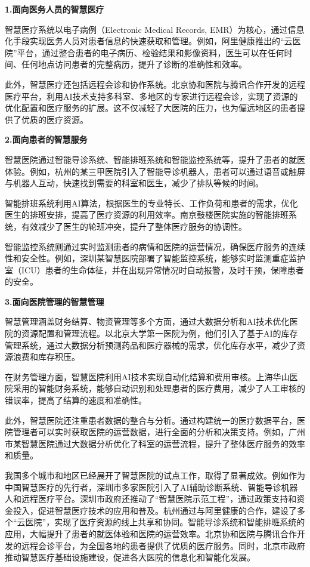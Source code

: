 \textbf{1.面向医务人员的智慧医疗}

智慧医疗系统以电子病例（Electronic Medical Records, EMR）为核心，通过信息化手段实现医务人员对患者信息的快速获取和管理。例如，阿里健康推出的“云医院”平台，通过整合患者的电子病历、检验结果和影像资料，医生可以在任何时间、任何地点访问患者的完整病历，提升了诊断的准确性和效率。

此外，智慧医疗还包括远程会诊和协作系统。北京协和医院与腾讯合作开发的远程医疗平台，利用AI技术支持多科室、多地区的专家进行远程会诊，实现了资源的优化配置和医疗服务的扩展。这不仅减轻了大医院的压力，也为偏远地区的患者提供了优质的医疗资源。

\textbf{2.面向患者的智慧服务}

智慧医院通过智能导诊系统、智能排班系统和智能监控系统等，提升了患者的就医体验。例如，杭州的某三甲医院引入了智能导诊机器人，患者可以通过语音或触屏与机器人互动，快速找到需要的科室和医生，减少了排队等候的时间。

智能排班系统利用AI算法，根据医生的专业特长、工作负荷和患者的需求，优化医生的排班安排，提高了医疗资源的利用效率。南京鼓楼医院实施的智能排班系统，有效减少了医生的轮班冲突，提升了整体医疗服务的协调性。

智能监控系统则通过实时监测患者的病情和医院的运营情况，确保医疗服务的连续性和安全性。例如，深圳某智慧医院部署了智能监控系统，能够实时监测重症监护室（ICU）患者的生命体征，并在出现异常情况时自动报警，及时干预，保障患者的安全。

\textbf{3.面向医院管理的智慧管理}

智慧管理涵盖财务结算、物资管理等多个方面，通过大数据分析和AI技术优化医院的资源配置和管理流程。以北京大学第一医院为例，他们引入了基于AI的库存管理系统，通过大数据分析预测药品和医疗器械的需求，优化库存水平，减少了资源浪费和库存积压。

在财务管理方面，智慧医院利用AI技术实现自动化结算和费用审核。上海华山医院采用的智能财务系统，能够自动识别和处理患者的医疗费用，减少了人工审核的错误率，提高了结算的速度和准确性。

此外，智慧医院还注重患者数据的整合与分析。通过构建统一的医疗数据平台，医院管理者可以实时获取医院的运营数据，进行全面的分析和决策支持。例如，广州市某智慧医院通过大数据分析优化了科室的运营流程，提升了整体医疗服务的效率和质量。

我国多个城市和地区已经展开了智慧医院的试点工作，取得了显著成效。例如作为中国智慧医疗的先行者，深圳市多家医院引入了AI辅助诊断系统、智能导诊机器人和远程医疗平台。深圳市政府还推动了“智慧医院示范工程”，通过政策支持和资金投入，促进智慧医疗技术的应用和普及。杭州通过与阿里健康的合作，建设了多个“云医院”，实现了医疗资源的线上共享和协同。智能导诊系统和智能排班系统的应用，大幅提升了患者的就医体验和医院的运营效率。北京协和医院与腾讯合作开发的远程会诊平台，为全国各地的患者提供了优质的医疗服务。同时，北京市政府推动智慧医疗基础设施建设，促进各大医院的信息化和智能化发展。

